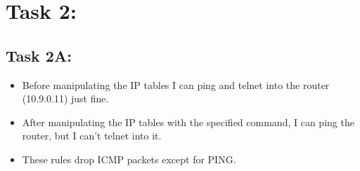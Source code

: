 \documentclass[11pt]{article}
\begin{document}
\section*{Task 2:}
\label{sec:org147855f}
\subsection*{Task 2A:}
\label{sec:orgbc64358}
\begin{itemize}
\item Before manipulating the IP tables I can ping and telnet into the router (10.9.0.11) just fine.
\item After manipulating the IP tables with the specified command, I can ping the router, but I can't telnet into it.
\item These rules drop ICMP packets except for PING.
\end{itemize}
\end{document}
